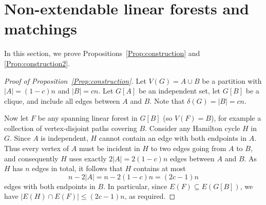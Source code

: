 \documentclass[11pt,reqno]{amsart}
\theoremstyle{definition}
\theoremstyle{remark}
\newtheorem{remark}[theorem]{Remark}
\renewcommand\le{\leqslant}
\renewcommand\ge{\geqslant}
\begin{document}
\medskip



\section{Non-extendable linear forests and matchings}\label{sec:badconstruction}
In this section, we prove Propositions~\ref{Prop:construction} and \ref{Prop:construction2}.

\begin{proof}[Proof of Proposition~\ref{Prop:construction}]
Let $V(G)=A\cup B$ be a partition with $|A|=(1-c)n$ and $|B|=cn$.
Let $G[A]$ be an independent set, let $G[B]$ be a clique, and include all edges
between $A$ and $B$.
Note that
$\delta(G)=|B|=cn$.

Now let $F$ be any spanning linear forest in $G[B]$ (so $V(F)=B$), for example a
collection of vertex-disjoint paths covering $B$.
Consider any Hamilton cycle $H$ in $G$.
Since $A$ is independent, $H$ cannot contain an edge with both endpoints in $A$.
Thus every vertex of $A$ must be incident in $H$ to two edges going from $A$ to
$B$, and consequently $H$ uses exactly $2|A|=2(1-c)n$ edges between $A$ and $B$.
As $H$ has $n$ edges in total, it follows that $H$ contains at most
\[
n-2|A|=n-2(1-c)n=(2c-1)n
\]
edges with both endpoints in $B$.
In particular, since $E(F)\subseteq E(G[B])$, we have $|E(H)\cap E(F)|\le (2c-1)n$,
as required.
\end{proof}

\end{document}
